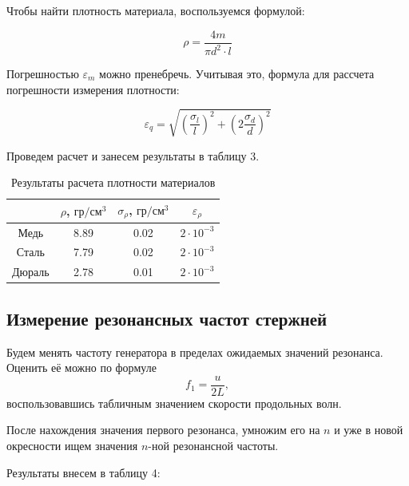 \documentclass[a4paper, 12pt]{article}
\begin{document}
    Чтобы найти плотность материала, воспользуемся формулой:

    \begin{equation}
        \rho = \frac{4m}{\pi d^2 \cdot l}
    \end{equation}

    Погрешностью $\varepsilon_m$ можно пренебречь. Учитывая это, формула для рассчета погрешности измерения плотности:

    \begin{equation}
        \varepsilon_q = \sqrt{(\frac{\sigma_l}{l})^2 + (2\frac{\sigma_d}{d})^2}
    \end{equation}

    Проведем расчет и занесем результаты в таблицу 3.
    \begin{table}[h]
    \centering
        \begin{tabular}{|c|c|c|c|}
        \hline
        \multicolumn{1}{|l|}{} & $\rho$, $гр/см^3$ & $\sigma_{\rho}$, $гр/см^3$ & $\varepsilon_{\rho}$ \\ \hline
        Медь                   & 8.89         & 0.02               & $2 \cdot 10^{-3}$       \\ \hline
        Сталь                  & 7.79         & 0.02               & $2 \cdot 10^{-3}$       \\ \hline
        Дюраль              & 2.78         & 0.01               & $2 \cdot 10^{-3}$       \\ \hline
        \end{tabular}
        \caption{Результаты расчета плотности материалов}
    \end{table}

\newpage

    \subsection{Измерение резонансных частот стержней}

    Будем менять частоту генератора в пределах ожидаемых значений резонанса. Оценить её можно по формуле
    \begin{equation}
        f_1 = \frac{u}{2L},
    \end{equation}
    воспользовавшись табличным значением скорости продольных волн.
    
    После нахождения значения первого резонанса, умножим его на $n$ и уже в новой окресности ищем значения $n$-ной резонансной частоты. 
    
    Результаты внесем в таблицу 4:
\end{document}
